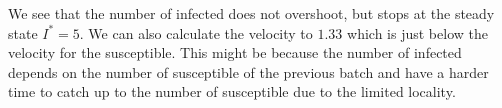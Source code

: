 We see that the number of infected does not overshoot, but stops at the steady state $I^*=5$. We can also calculate the velocity to $1.33$ which is just below the velocity for the susceptible. This might be because the number of infected depends on the number of susceptible of the previous batch and have a harder time to catch up to the number of susceptible due to the limited locality.

